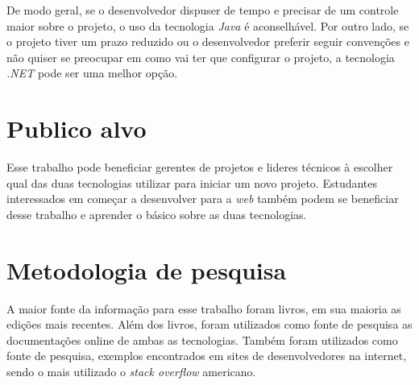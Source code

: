De modo geral, se o desenvolvedor dispuser de tempo e precisar de um controle maior sobre o projeto, o uso da tecnologia \textit{Java} é aconselhável. Por outro lado, se o projeto tiver um prazo reduzido ou o desenvolvedor preferir seguir convenções e não quiser se preocupar em como vai ter que configurar o projeto, a tecnologia \textit{.NET} pode ser uma melhor opção.
 
\section{Publico alvo}
\label{sec:publicalvo}

Esse trabalho pode beneficiar gerentes de projetos e lideres técnicos à escolher qual das duas tecnologias utilizar para iniciar um novo projeto. Estudantes interessados em começar a desenvolver para a \textit{web} também podem se beneficiar desse trabalho e aprender o básico sobre as duas tecnologias.

\section{Metodologia de pesquisa}
\label{sec:metodologiapesquisa}

A maior fonte da informação para esse trabalho foram livros, em sua maioria as edições mais recentes. Além dos livros, foram utilizados como fonte de pesquisa as documentações online de ambas as tecnologias. Também foram utilizados como fonte de pesquisa, exemplos encontrados em sites de desenvolvedores na internet, sendo o mais utilizado o \textit{stack overflow} americano.